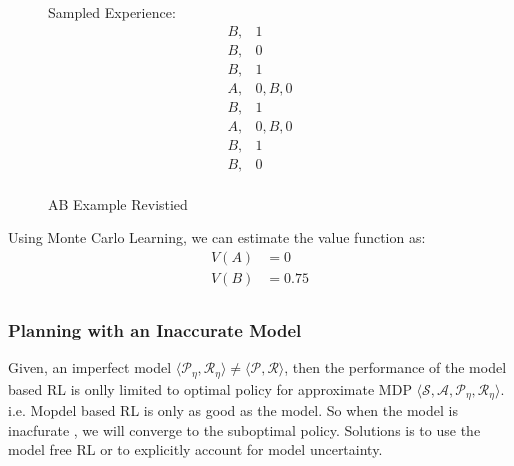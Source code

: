 \begin{example}[AB Example]
\begin{figure}[H]
\begin{minipage}{0.33\textwidth}
            \caption{AB Example Revistied}
            \label{fig:ab_ex_2}
        \end{minipage}%
        \begin{minipage}{0.33\textwidth}
            \centering
            Sampled Experience:
            \[
                \begin{aligned}
                    B, & 1\\
                    B, & 0\\
                    B, & 1\\ 
                    A, & 0, B, 0 \\        
                    B, & 1\\        
                    A, & 0, B, 0 \\        
                    B, & 1\\        
                    B, & 0\\ 
                \end{aligned}
            \]
        \end{minipage}
    \end{figure}
    Using Monte Carlo Learning, we can estimate the value function as:
    \[
        \begin{aligned}
            V(A) &= 0 \\
            V(B) &= 0.75\\
        \end{aligned}
    \]
\end{example}

\subsubsection{Planning with an Inaccurate Model}
Given, an imperfect model \(\langle \mathcal{P}_\eta, \mathcal{R}_\eta \rangle \neq \langle \mathcal{P}, \mathcal{R} \rangle\),
then the performance of the model based RL is onlly limited to optimal policy for approximate MDP
\(\langle \mathcal{S}, \mathcal{A}, \mathcal{P}_\eta, \mathcal{R}_\eta \rangle\). i.e. Mopdel based RL is only as good as the model.
So when the model is inacfurate , we will converge to the suboptimal policy. Solutions is to use the model free RL
or to explicitly account for model uncertainty.

